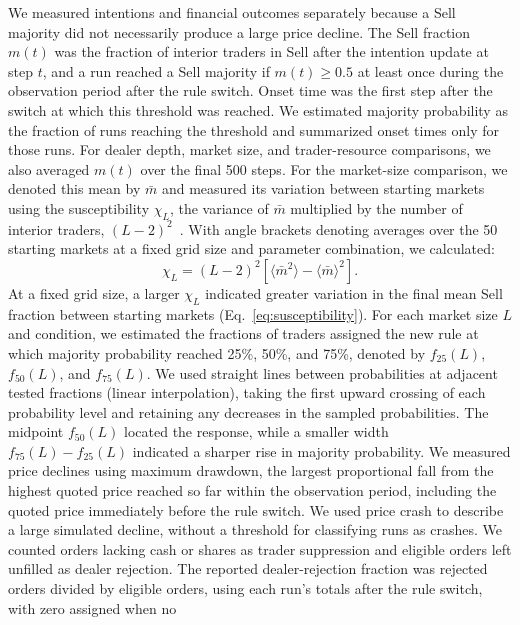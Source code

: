 We measured intentions and financial outcomes separately because a Sell
majority did not necessarily produce a large price decline. The Sell
fraction $m(t)$ was the fraction of interior traders in Sell after the
intention update at step $t$, and a run reached a Sell majority if $m(t)\geq0.5$ at least once
during the observation period after the rule switch. Onset time was the
first step after the switch at which this threshold was reached. We
estimated majority probability as the fraction of runs reaching the
threshold and summarized onset times only for those runs. For dealer
depth, market size, and trader-resource comparisons, we also averaged
$m(t)$ over the final 500 steps. For the market-size comparison, we
denoted this mean by $\bar m$ and measured its variation between
starting markets using the susceptibility $\chi_L$, the variance of
$\bar m$ multiplied by the number of interior traders,
$(L-2)^2$~\cite{binder1981finite,landau2021guide}. With angle brackets
denoting averages over the 50 starting markets at a fixed grid size and
parameter combination, we calculated:
\begin{equation}
 \chi_L=(L-2)^2\left[\langle\bar m^2\rangle-
                         \langle\bar m\rangle^2\right].
 \label{eq:susceptibility}
\end{equation}
At a fixed grid size, a larger $\chi_L$ indicated greater variation in
the final mean Sell fraction between starting markets
(Eq.~\ref{eq:susceptibility}). For each market size $L$ and condition, we estimated the fractions of
traders assigned the new rule at which majority probability reached
25\%, 50\%, and 75\%, denoted by $f_{25}(L)$, $f_{50}(L)$, and
$f_{75}(L)$. We used straight lines between probabilities at adjacent
tested fractions (linear interpolation), taking the first upward crossing
of each probability level and retaining any decreases in the sampled
probabilities. The midpoint $f_{50}(L)$ located the response, while a
smaller width $f_{75}(L)-f_{25}(L)$ indicated a sharper rise in majority
probability.  We measured price declines using maximum
drawdown, the largest proportional fall from the highest quoted price
reached so far within the observation period, including the quoted price
immediately before the rule switch. We used price crash to describe a
large simulated decline, without a threshold for classifying runs as
crashes. We counted orders lacking cash or shares as trader suppression
and eligible orders left unfilled as dealer rejection. The reported
dealer-rejection fraction was rejected orders divided by eligible orders,
using each run's totals after the rule switch, with zero assigned when no

